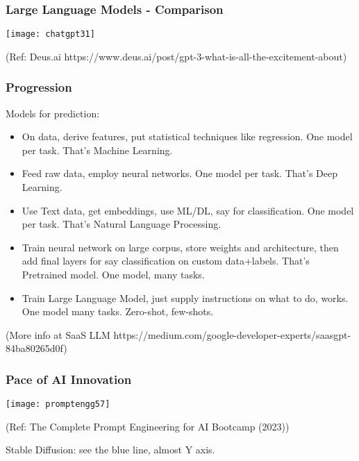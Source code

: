\begin{frame}[fragile]\frametitle{Large Language Models - Comparison}

\begin{center}
\texttt{[image: chatgpt31]}
\end{center}				
{\tiny (Ref: Deus.ai https://www.deus.ai/post/gpt-3-what-is-all-the-excitement-about)}

\end{frame}

\begin{frame}[fragile]\frametitle{Progression}

Models for prediction:

\begin{itemize}
\item On data, derive features, put statistical techniques like regression. One model per task. That's Machine Learning.
\item Feed raw data, employ neural networks. One model per task. That's Deep Learning.
\item Use Text data, get embeddings, use ML/DL, say for classification. One model per task. That's Natural Language Processing.
\item Train neural network on large corpus, store weights and architecture, then add final layers for say classification on custom data+labels. That's Pretrained model. One model, many tasks.
\item Train Large Language Model, just supply instructions on what to do, works. One model many tasks. Zero-shot, few-shots.
\end{itemize}

{\tiny (More info at SaaS LLM https://medium.com/google-developer-experts/saasgpt-84ba80265d0f)}

\end{frame}



\begin{frame}[fragile]\frametitle{Pace of AI Innovation}

\begin{center}
\texttt{[image: promptengg57]}

{\tiny (Ref: The Complete Prompt Engineering for AI Bootcamp (2023))}

\end{center}

Stable Diffusion: see the blue line, almost Y axis.
				
\end{frame}

